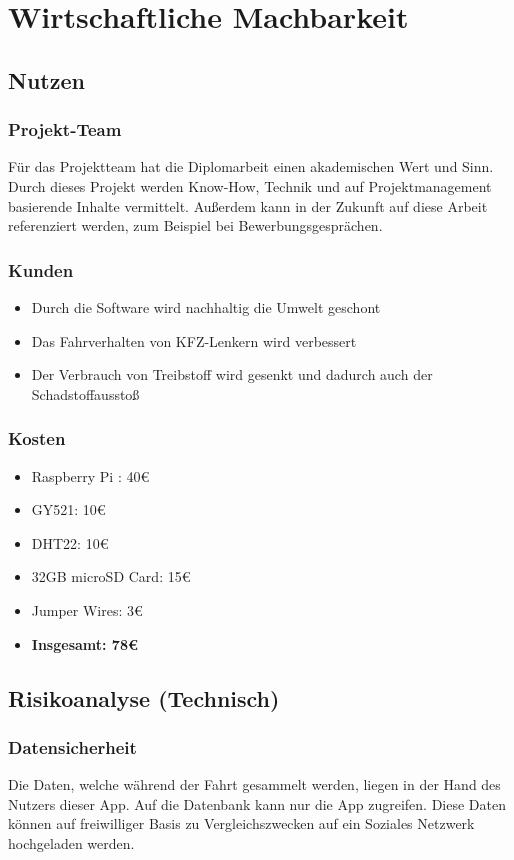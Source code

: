 \chapter{Wirtschaftliche Machbarkeit}

\section{Nutzen}

\subsection{Projekt-Team}
Für das Projektteam hat die Diplomarbeit einen akademischen Wert und Sinn.
Durch dieses Projekt werden Know-How, Technik und auf Projektmanagement
basierende Inhalte vermittelt. Außerdem kann in der Zukunft auf diese Arbeit
referenziert werden, zum Beispiel bei Bewerbungsgesprächen.


\subsection{Kunden}
\begin{itemize}
\item Durch die Software wird nachhaltig die Umwelt geschont
\item Das Fahrverhalten von KFZ-Lenkern wird verbessert
\item Der Verbrauch von Treibstoff wird gesenkt und dadurch auch der Schadstoffausstoß
\end{itemize}

\subsection{Kosten}
\begin{itemize}
\item Raspberry Pi : 40€
\item GY521: 10€
\item DHT22: 10€
\item 32GB microSD Card: 15€
\item Jumper Wires: 3€
\item \textbf{Insgesamt: 78€}
\end{itemize}

\section{Risikoanalyse (Technisch)}
\subsection{Datensicherheit}
Die Daten, welche während der Fahrt gesammelt werden, liegen in der Hand des
Nutzers dieser App. Auf die Datenbank kann nur die App zugreifen.
Diese Daten können auf freiwilliger Basis zu Vergleichszwecken 
auf ein Soziales Netzwerk hochgeladen werden.


